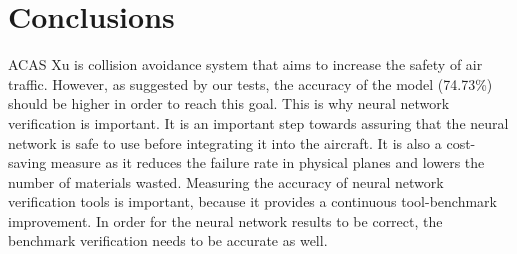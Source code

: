 \documentclass{article}
\begin{document}
\section{Conclusions}
ACAS Xu is collision avoidance system that aims to increase the safety of air traffic. However, as suggested by our tests, the accuracy of the model (74.73\%) should be higher in order to reach this goal. This is why neural network verification is important. It is an important step towards assuring that the neural network is safe to use before integrating it into the aircraft. It is also a cost-saving measure as it reduces the failure rate in physical planes and lowers the number of materials wasted.
\newline
Measuring the accuracy of neural network verification tools is important, because it provides a continuous tool-benchmark improvement. In order for the neural network results to be correct, the benchmark verification needs to be accurate as well.
\clearpage


\end{document}
